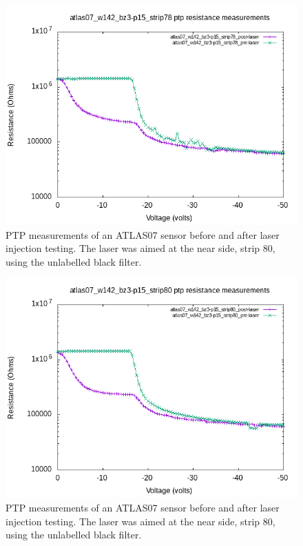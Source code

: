 \documentclass{report}
\begin{document}
            \begin{figure}[h] 
                \includegraphics[height=.4\textheight]{atlas07_w142_bz3-p15_strip78_resistance_plots}
                \centering
                \caption{ PTP measurements of an ATLAS07 sensor before and after laser injection testing. The laser was aimed at the near side, strip 80, using the unlabelled black filter. }
                \label{fig:atlas07_w142_bz3-p15_strip78_resistance_plots}
            \end{figure}

            \begin{figure}[h] 
                \includegraphics[height=.4\textheight]{atlas07_w142_bz3-p15_strip80_resistance_plots}
                \centering
                \caption{ PTP measurements of an ATLAS07 sensor before and after laser injection testing. The laser was aimed at the near side, strip 80, using the unlabelled black filter. }
                \label{fig:atlas07_w142_bz3-p15_strip80_resistance_plots}
            \end{figure}
\end{document}
